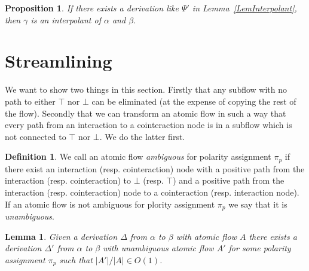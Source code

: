 \documentclass[a4paper]{amsart}
\newtheorem{lem}[thm]{Lemma}
\newtheorem{pro}[thm]{Proposition}
\theoremstyle{remark}
\theoremstyle{definition}
\newtheorem{defi}[thm]{Definition}
\begin{document}
\begin{pro}
If there exists a derivation like $\Psi'$ in Lemma~\ref{LemInterpolant}, then $\gamma$ is an interpolant of $\alpha$ and $\beta$.
\end{pro}

\section{Streamlining}

We want to show two things in this section. Firstly that any subflow with no path to either $\top$ nor $\bot$ can be eliminated (at the expense of copying the rest of the flow). Secondly that we can transform an atomic flow in such a way that every path from an interaction to a cointeraction node is in a subflow which is not connected to $\top$ nor $\bot$. We do the latter first.

\begin{defi}
We call an atomic flow \emph{ambiguous} for polarity assignment $\pi_p$ if there exist an interaction (resp. cointeraction) node with a positive path from the interaction (resp. cointeraction) to $\bot$ (resp. $\top$) and a positive path from the interaction (resp. cointeraction) node to a cointeraction (resp. interaction node). If an atomic flow is not ambiguous for plority assignment $\pi_p$ we say that it is \emph{unambiguous}.
\end{defi}

\begin{lem}
Given a derivation $\Delta$ from $\alpha$ to $\beta$ with atomic flow $A$ there exists a derivation $\Delta'$ from $\alpha$ to $\beta$ with unambiguous atomic flow $A'$ for some polarity assignment $\pi_p$ such that $|A'|/|A|\in O(1)$.
\end{lem}
\end{document}
